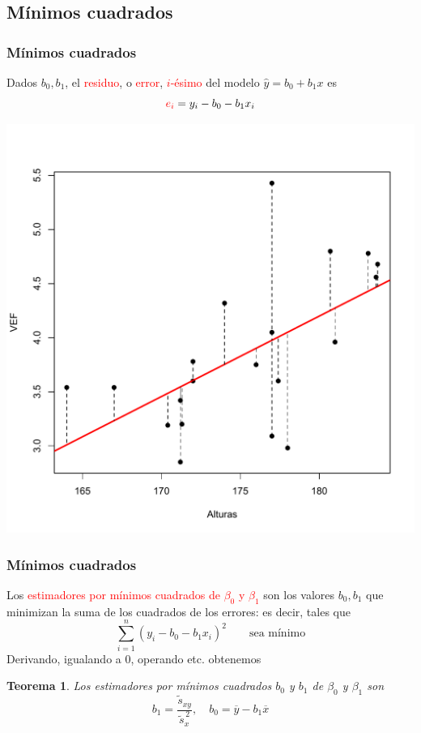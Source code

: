 \documentclass[12pt,t]{beamer}
\newcommand{\red}[1]{\textcolor{red}{#1}}
\theoremstyle{plain}
\newtheorem{teorema}{Teorema}
\theoremstyle{definition}
\begin{document}
\subsection{Mínimos cuadrados}

\begin{frame}
\frametitle{Mínimos cuadrados}

Dados $b_0,b_1$, el \red{residuo}, o \red{error}, \red{$i$-ésimo} del modelo $\widehat{y}=b_0+b_1 x$ es
$$
\red{e_i}=y_i-b_0-b_1 x_i
$$
\begin{center}
\includegraphics[width=0.6\linewidth]{plotVEF3.pdf}
\end{center}

\end{frame}

\begin{frame}
\frametitle{Mínimos cuadrados}


Los \red{estimadores por mínimos cuadrados de $\beta_0$ y $\beta_1$} son los valores $b_0,b_1$ que minimizan la suma de los cuadrados de los errores: es decir, tales que
$$
\sum_{i=1}^n (y_i-b_0-b_1 x_i)^2\qquad \mbox{sea mínimo}
$$
Derivando, igualando a 0, operando etc. obtenemos

\begin{teorema}
Los estimadores por mínimos cuadrados $b_0$ y $b_1$ de $\beta_0$ y $\beta_1$ son
$$
b_1 =\frac{\widetilde{s}_{xy}}{\widetilde{s}^{\, 2}_x},\quad b_0 = \overline{y}-b_1 \overline{x}
$$
\end{teorema}

\end{frame}
\end{document}

